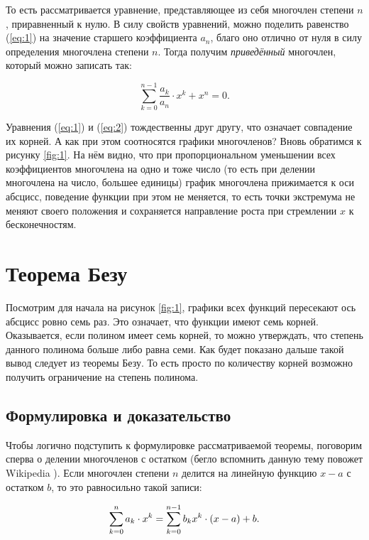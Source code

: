 \documentclass[12pt]{article}
\begin{document}
То есть рассматривается уравнение, представляющее из себя многочлен степени $n$, приравненный к нулю. В силу свойств уравнений, можно поделить равенство (\ref{eq:1}) на значение старшего коэффициента $a_n$, благо оно отлично от нуля в силу определения многочлена степени $n$. Тогда получим \emph{приведённый} многочлен, который можно записать так:

\begin{equation}\label{eq:2}
\sum_{k=0}^{n-1}{\dfrac{a_k}{a_n} \cdot x^k} + x^n = 0.
\end{equation}

Уравнения (\ref{eq:1}) и (\ref{eq:2}) тождественны друг другу, что означает совпадение их корней. А как при этом соотносятся графики многочленов? Вновь обратимся к рисунку \ref{fig:1}. На нём видно, что при пропорциональном уменьшении всех коэффициентов многочлена на одно и тоже число (то есть при делении многочлена на число, большее единицы) график многочлена прижимается к оси абсцисс, поведение функции при этом не меняется, то есть точки экстремума не меняют своего положения и сохраняется направление роста при стремлении $x$ к бесконечностям.

\section{Теорема Безу}
Посмотрим для начала на рисунок \ref{fig:1}, графики всех функций пересекают ось абсцисс ровно семь раз. Это означает, что функции имеют семь корней. Оказывается, если полином имеет семь корней, то можно утверждать, что степень данного полинома больше либо равна семи. Как будет показано дальше такой вывод следует из теоремы Безу. То есть просто по количеству корней возможно получить ограничение на степень полинома.

\subsection{Формулировка и доказательство}
Чтобы логично подступить к формулировке рассматриваемой теоремы, поговорим сперва о делении многочленов с остатком (бегло вспомнить данную тему повожет Wikipedia \cite{poly_div}). Если многочлен степени $n$ делится на линейную функцию $x-a$ с остатком $b$, то это равносильно такой записи:

\begin{equation}
\sum_{k=0}^n{a_k \cdot x^k} = \sum_{k=0}^{n-1}{b_k x^k}\cdot \qty(x-a) + b.
\label{eq:3}
\end{equation}
\end{document}
